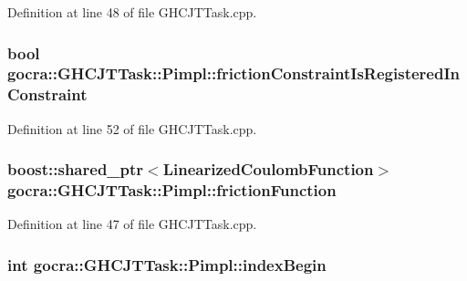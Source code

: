 Definition at line 48 of file G\+H\+C\+J\+T\+Task.\+cpp.

\subsubsection[{\texorpdfstring{friction\+Constraint\+Is\+Registered\+In\+Constraint}{frictionConstraintIsRegisteredInConstraint}}]{\setlength{\rightskip}{0pt plus 5cm}bool gocra\+::\+G\+H\+C\+J\+T\+Task\+::\+Pimpl\+::friction\+Constraint\+Is\+Registered\+In\+Constraint}\hypertarget{structgocra_1_1GHCJTTask_1_1Pimpl_ad92c2fff381cdb00f6afb41671e923c5}{}\label{structgocra_1_1GHCJTTask_1_1Pimpl_ad92c2fff381cdb00f6afb41671e923c5}


Definition at line 52 of file G\+H\+C\+J\+T\+Task.\+cpp.

\subsubsection[{\texorpdfstring{friction\+Function}{frictionFunction}}]{\setlength{\rightskip}{0pt plus 5cm}boost\+::shared\+\_\+ptr$<${\bf Linearized\+Coulomb\+Function}$>$ gocra\+::\+G\+H\+C\+J\+T\+Task\+::\+Pimpl\+::friction\+Function}\hypertarget{structgocra_1_1GHCJTTask_1_1Pimpl_a777d7f0a74a42508154b153dbc0a3b44}{}\label{structgocra_1_1GHCJTTask_1_1Pimpl_a777d7f0a74a42508154b153dbc0a3b44}


Definition at line 47 of file G\+H\+C\+J\+T\+Task.\+cpp.

\subsubsection[{\texorpdfstring{index\+Begin}{indexBegin}}]{\setlength{\rightskip}{0pt plus 5cm}int gocra\+::\+G\+H\+C\+J\+T\+Task\+::\+Pimpl\+::index\+Begin}\hypertarget{structgocra_1_1GHCJTTask_1_1Pimpl_a20542f3c613a7f9c0771c2b5ac0b38eb}{}\label{structgocra_1_1GHCJTTask_1_1Pimpl_a20542f3c613a7f9c0771c2b5ac0b38eb}


